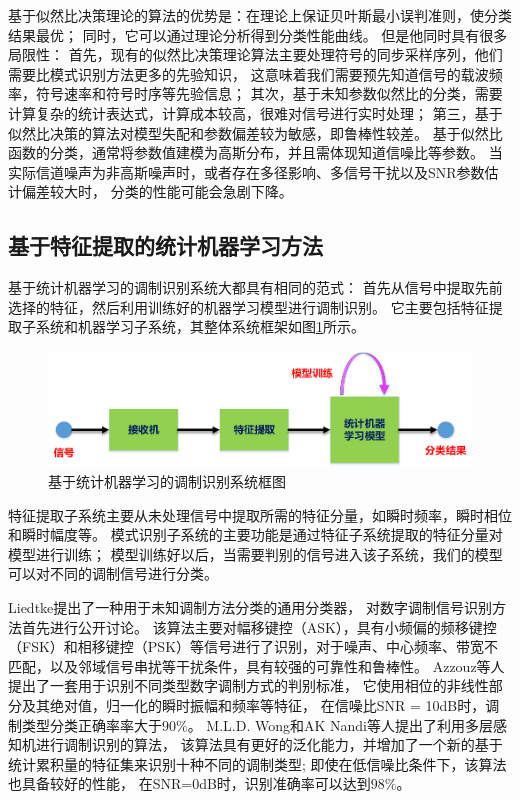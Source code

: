 基于似然比决策理论的算法的优势是：在理论上保证贝叶斯最小误判准则，使分类结果最优；
同时，它可以通过理论分析得到分类性能曲线。
但是他同时具有很多局限性：
首先，现有的似然比决策理论算法主要处理符号的同步采样序列，他们需要比模式识别方法更多的先验知识，
这意味着我们需要预先知道信号的载波频率，符号速率和符号时序等先验信息；
其次，基于未知参数似然比的分类，需要计算复杂的统计表达式，计算成本较高，很难对信号进行实时处理；
第三，基于似然比决策的算法对模型失配和参数偏差较为敏感，即鲁棒性较差。
基于似然比函数的分类，通常将参数值建模为高斯分布，并且需体现知道信噪比等参数。
当实际信道噪声为非高斯噪声时，或者存在多径影响、多信号干扰以及SNR参数估计偏差较大时，
分类的性能可能会急剧下降。\par
 
\subsection{基于特征提取的统计机器学习方法}

基于统计机器学习的调制识别系统大都具有相同的范式：
首先从信号中提取先前选择的特征，然后利用训练好的机器学习模型进行调制识别。
它主要包括特征提取子系统和机器学习子系统，其整体系统框架如图\ref{sec:fig_1_1}所示。\par

\begin{figure}
	\centering
	\includegraphics[scale=0.6]{figures/chapter_1/fig_1_1}
	\caption{基于统计机器学习的调制识别系统框图} \label{sec:fig_1_1}
\end{figure}

特征提取子系统主要从未处理信号中提取所需的特征分量，如瞬时频率，瞬时相位和瞬时幅度等。 
模式识别子系统的主要功能是通过特征子系统提取的特征分量对模型进行训练；
模型训练好以后，当需要判别的信号进入该子系统，我们的模型可以对不同的调制信号进行分类。\par

Liedtke提出了一种用于未知调制方法分类的通用分类器，
对数字调制信号识别方法首先进行公开讨论\cite{liedtke1984computer}。 
该算法主要对幅移键控（ASK），具有小频偏的频移键控（FSK）和相移键控（PSK）等信号进行了识别，对于噪声、中心频率、带宽不匹配，以及邻域信号串扰等干扰条件，具有较强的可靠性和鲁棒性。 
Azzouz等人提出了一套用于识别不同类型数字调制方式的判别标准，
它使用相位的非线性部分及其绝对值，归一化的瞬时振幅和频率等特征，
在信噪比SNR = 10dB时，调制类型分类正确率率大于$90\%$\cite{azzouz1995automatic}。
M.L.D. Wong和AK Nandi等人提出了利用多层感知机进行调制识别的算法，
该算法具有更好的泛化能力，并增加了一个新的基于统计累积量的特征集来识别十种不同的调制类型;
即使在低信噪比条件下，该算法也具备较好的性能，
在SNR=0dB时，识别准确率可以达到$98\%$\cite{wong2001automatic}。\par


